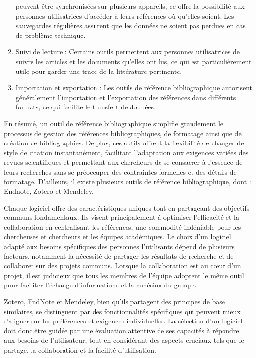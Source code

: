\documentclass[
  letterpaper,
]{scrbook}
\begin{document}
\begin{enumerate}
  peuvent être synchronisées sur plusieurs appareils, ce offre la
  possibilité aux personnes utilisatrices d'accéder à leurs références
  où qu'elles soient. Les sauvegardes régulières assurent que les
  données ne soient pas perdues en cas de problème technique.
\item
  Suivi de lecture : Certains outils permettent aux personnes
  utilisatrices de suivre les articles et les documents qu'elles ont
  lus, ce qui est particulièrement utile pour garder une trace de la
  littérature pertinente.
\item
  Importation et exportation : Les outils de référence bibliographique
  autorisent généralement l'importation et l'exportation des références
  dans différents formats, ce qui facilite le transfert de données.
\end{enumerate}

En résumé, un outil de référence bibliographique simplifie grandement le
processus de gestion des références bibliographiques, de formatage ainsi
que de création de bibliographies. De plus, ces outils offrent la
flexibilité de changer de style de citation instantanément, facilitant
l'adaptation aux exigences variées des revues scientifiques et
permettant aux chercheurs de se consacrer à l'essence de leurs
recherches sans se préoccuper des contraintes formelles et des détails
de formatage. D'ailleurs, il existe plusieurs outils de référence
bibliographique, dont : Endnote, Zotero et Mendeley.

Chaque logiciel offre des caractéristiques uniques tout en partageant
des objectifs communs fondamentaux. Ils visent principalement à
optimiser l'efficacité et la collaboration en centralisant les
références, une commodité indéniable pour les chercheuses et chercheurs
et les équipes académiques. Le choix d'un logiciel adapté aux besoins
spécifiques des personnes l'utilisants dépend de plusieurs facteurs,
notamment la nécessité de partager les résultats de recherche et de
collaborer sur des projets communs. Lorsque la collaboration est au cœur
d'un projet, il est judicieux que tous les membres de l'équipe adoptent
le même outil pour faciliter l'échange d'informations et la cohésion du
groupe.

Zotero, EndNote et Mendeley, bien qu'ils partagent des principes de base
similaires, se distinguent par des fonctionnalités spécifiques qui
peuvent mieux s'aligner sur les préférences et exigences individuelles.
La sélection d'un logiciel doit donc être guidée par une évaluation
attentive de ses capacités à répondre aux besoins de l'utilisateur, tout
en considérant des aspects cruciaux tels que le partage, la
collaboration et la facilité d'utilisation.
\end{document}
